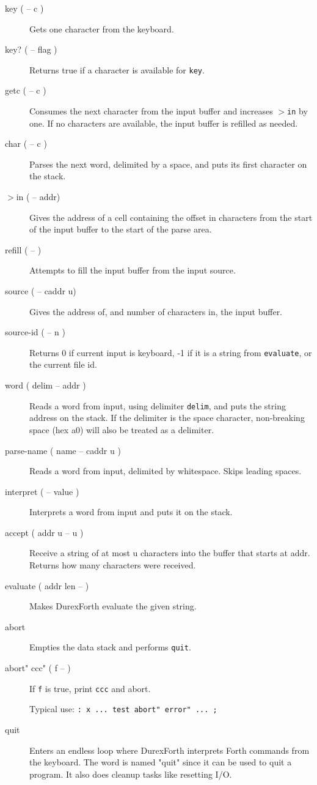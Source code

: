 \begin{description}

\item[key ( -- c )] Gets one character from the keyboard.
\item[key? ( -- flag )] Returns true if a character is available for \texttt{key}.
\item[getc ( -- c )] Consumes the next character from the input buffer and increases \texttt{$>$in} by one. If no characters are available, the input buffer is refilled as needed.

\item[char ( -- c )] Parses the next word, delimited by a space, and puts its first character on the stack.

\item[$>$in ( -- addr)] Gives the address of a cell containing the offset in characters from the start of the input buffer to the start of the parse area.

\item[refill ( -- )] Attempts to fill the input buffer from the input source.

\item[source ( -- caddr u)] Gives the address of, and number of characters in, the input buffer.
\item[source-id ( -- n )] Returns 0 if current input is keyboard, -1 if it is a string from \texttt{evaluate}, or the current file id.

\item[word ( delim -- addr )] Reads a word from input, using delimiter \texttt{delim}, and puts the string address on the stack. If the delimiter is the space character, non-breaking space (hex a0) will also be treated as a delimiter.

\item[parse-name ( name -- caddr u )] Reads a word from input, delimited by whitespace. Skips leading spaces.

\item[interpret ( -- value )] Interprets a word from input and puts it on the stack.

\item[accept ( addr u -- u )] Receive a string of at most u characters into the buffer that starts at addr. Returns how many characters were received.

\item[evaluate ( addr len -- )] Makes DurexForth evaluate the given string.

\item[abort] Empties the data stack and performs \texttt{quit}.

\item[abort" ccc" ( f -- ) ] If \texttt{f} is true, print \texttt{ccc} and abort.

    Typical use: \texttt{: x ... test abort" error" ... ;}

\item[quit] Enters an endless loop where DurexForth interprets Forth commands from the keyboard. The word is named "quit" since it can be used to quit a program. It also does cleanup tasks like resetting I/O.

\end{description}

